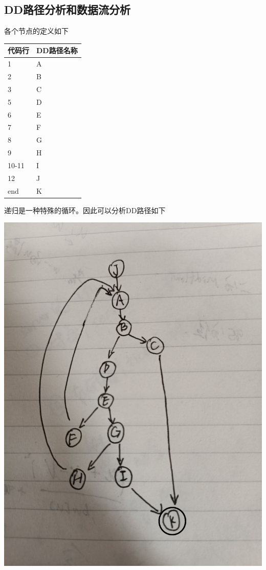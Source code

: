 \documentclass[12pt, a4paper, oneside]{ctexart}
\begin{document}
\subsection{DD路径分析和数据流分析}

\newpage

各个节点的定义如下

\begin{table}[!h]
    \begin{tabular}{|l|l|}
    \hline
    代码行 & DD路径名称\\ \hline
    1 & A\\ \hline
    2 & B\\ \hline
    3 & C \\ \hline
    5 & D \\ \hline
    6 & E \\ \hline
    7 & F \\ \hline
    8 & G \\ \hline
    9 & H \\ \hline
    10-11 & I \\ \hline
    12 & J \\ \hline
    end & K \\ \hline
    \end{tabular}
\end{table}

递归是一种特殊的循环。因此可以分析DD路径如下

\includegraphics[scale=0.2]{screenshots/DD-search.jpg}
\end{document}
